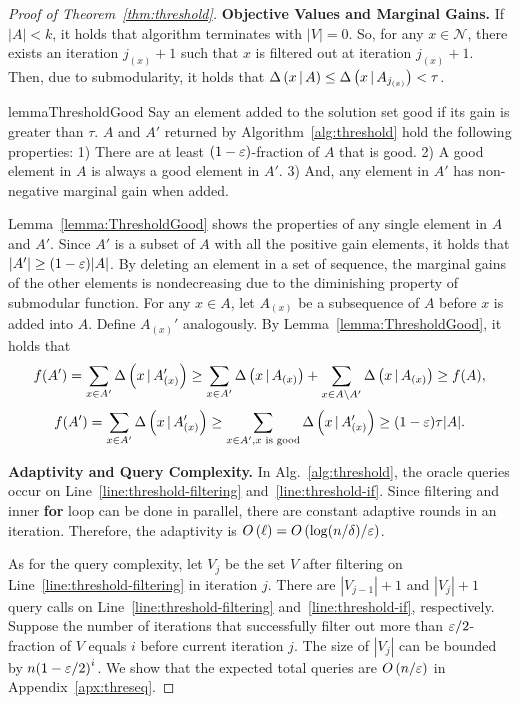 \begin{proof}[Proof of Theorem~\ref{thm:threshold}]
	\textbf{Objective Values and Marginal Gains.}
	If $|A| < k$, it holds that algorithm terminates with $|V| = 0$.
	So, for any $x \in \mathcal{N}$,
	there exists an iteration $j_{(x)}+1$ such that
	$x$ is filtered out at iteration $j_{(x)}+1$.
	Then, due to submodularity, 
	it holds that $\Delta \left( x \, | \, A \right) \le \Delta \left( x \, | \, A_{j_{(x)}} \right)<\tau$.
	\begin{restatable}{lemma}{ThresholdGood}
		\label{lemma:ThresholdGood}
		Say an element added to the solution set good if its gain is greater than $\tau$.
		$A$ and $A'$ returned by Algorithm~\ref{alg:threshold} hold the following properties: 
		1) There are at least $(1-\varepsilon)$-fraction of $A$ that is good.
		2) A good element in $A$ is always a good element in $A'$. 
		3) And, any element in $A'$ has non-negative marginal gain when added.
	\end{restatable}
	Lemma~\ref{lemma:ThresholdGood} shows the properties of any single element 
	in $A$ and $A'$.
	Since $A'$ is a subset of $A$ with all the positive gain elements,
	it holds that $|A'|\ge (1-\varepsilon)|A|$.
	By deleting an element in a set of sequence,
	the marginal gains of the other elements is nondecreasing due to 
	the diminishing property of submodular function.
	For any $x \in A$, let $A_{(x)}$ be a subsequence of $A$ before
	$x$ is added into $A$. Define $A_{(x)}'$ analogously.
	By Lemma~\ref{lemma:ThresholdGood}, it holds that
	\[f(A') = \sum_{x \in A'}\Delta \left( x \, | \, A_{(x)}' \right)
	\ge \sum_{x \in A'}\Delta \left( x \, | \, A_{(x)} \right)
	+\sum_{x \in A\backslash A'}\Delta \left( x \, | \, A_{(x)} \right)
	\ge f(A),\]
	\[f(A')= \sum_{x \in A'}\Delta \left( x \, | \, A_{(x)}' \right)
	\ge \sum_{x \in A', x \text{ is good}}\Delta \left( x \, | \, A_{(x)}' \right)
	\ge (1-\varepsilon)\tau |A|.\]

	\textbf{Adaptivity and Query Complexity.}
	In Alg.~\ref{alg:threshold}, the oracle queries occur on 
	Line~\ref{line:threshold-filtering} and~\ref{line:threshold-if}.
	Since filtering and inner \textbf{for} loop can be done in parallel, 
	there are constant adaptive rounds in an iteration.
	Therefore, the adaptivity is $O\left( \ell \right) = O\left( \log(n/\delta)/\varepsilon \right)$.
	
	As for the query complexity, 
	let $V_j$ be the set $V$ after filtering on Line~\ref{line:threshold-filtering}
	in iteration $j$.
	There are $|V_{j-1}|+1$ and $|V_{j}|+1$ query calls on 
	Line~\ref{line:threshold-filtering} and~\ref{line:threshold-if},
	respectively.
	Suppose the number of
	iterations that successfully filter out more than 
	$\varepsilon/2$-fraction of $V$ equals $i$
	before current iteration $j$.
	The size of $|V_j|$ can be bounded by $n{(1-\varepsilon/2)}^{i}$.
	We show that the expected total queries are $O\left( n/\varepsilon \right)$ 
	in Appendix~\ref{apx:threseq}.
\end{proof}

